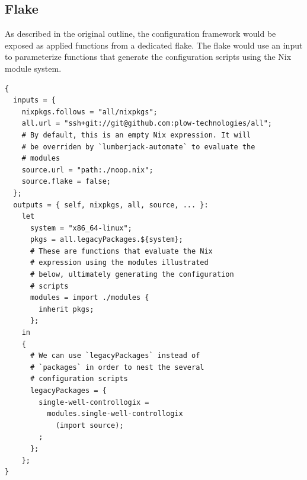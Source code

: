 \documentclass[11pt]{article}
\begin{document}
\subsection*{Flake}
\label{sec:orga14523e}
As described in the original outline, the configuration framework would be exposed as applied functions from a dedicated flake. The flake would use an input to parameterize functions that generate the configuration scripts using the Nix module system.
\lstset{language=nix,label= ,caption= ,captionpos=b,numbers=none}
\begin{lstlisting}
{
  inputs = {
    nixpkgs.follows = "all/nixpkgs";
    all.url = "ssh+git://git@github.com:plow-technologies/all";
    # By default, this is an empty Nix expression. It will
    # be overriden by `lumberjack-automate` to evaluate the
    # modules
    source.url = "path:./noop.nix";
    source.flake = false;
  };
  outputs = { self, nixpkgs, all, source, ... }:
    let
      system = "x86_64-linux";
      pkgs = all.legacyPackages.${system};
      # These are functions that evaluate the Nix
      # expression using the modules illustrated
      # below, ultimately generating the configuration
      # scripts
      modules = import ./modules {
        inherit pkgs;
      };
    in
    {
      # We can use `legacyPackages` instead of
      # `packages` in order to nest the several
      # configuration scripts
      legacyPackages = {
        single-well-controllogix =
          modules.single-well-controllogix
            (import source);
        ;
      };
    };
}
\end{lstlisting}
\end{document}
